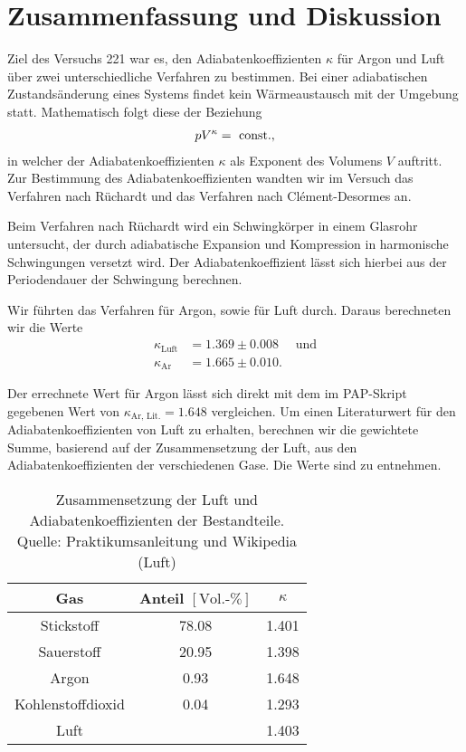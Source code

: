 \section{Zusammenfassung und Diskussion}

Ziel des Versuchs 221 war es, den Adiabatenkoeffizienten $\kappa$ für Argon und Luft über zwei unterschiedliche Verfahren zu bestimmen. Bei einer adiabatischen Zustandsänderung eines Systems findet kein Wärmeaustausch mit der Umgebung statt. Mathematisch folgt diese der Beziehung
\begin{align}
  pV^{\kappa} = \text{ const.},
\end{align}
in welcher der Adiabatenkoeffizienten $\kappa$ als Exponent des Volumens $V$ auftritt. Zur Bestimmung des Adiabatenkoeffizienten wandten wir im Versuch das Verfahren nach Rüchardt und das Verfahren nach Clément-Desormes an.

Beim Verfahren nach Rüchardt wird ein Schwingkörper in einem Glasrohr untersucht, der durch adiabatische Expansion und Kompression in harmonische Schwingungen versetzt wird. Der Adiabatenkoeffizient lässt sich hierbei aus der Periodendauer der Schwingung berechnen.

Wir führten das Verfahren für Argon, sowie für Luft durch. Daraus berechneten wir die Werte
\begin{align}
  \kappa_{\text{Luft}} &= 1.369 \pm 0.008 \quad\text{ und}\\[1em]
  \kappa_{\text{Ar}} &= 1.665 \pm 0.010.
\end{align}

Der errechnete Wert für Argon lässt sich direkt mit dem im PAP-Skript gegebenen Wert von $\kappa_{\text{Ar, Lit.}} = 1.648$ vergleichen. Um einen Literaturwert für den Adiabatenkoeffizienten von Luft zu erhalten, berechnen wir die gewichtete Summe, basierend auf der Zusammensetzung der Luft, aus den Adiabatenkoeffizienten der verschiedenen Gase. Die Werte sind  zu entnehmen.

\begin{table}[H]
  \centering
  \begin{tabular}{c|c|c}
    Gas & Anteil $[\text{Vol.-}\%]$ & $\kappa$\\\hline
    Stickstoff & 78.08 & 1.401\\
    Sauerstoff & 20.95 & 1.398\\
    Argon & 0.93 & 1.648\\
    Kohlenstoffdioxid & 0.04 & 1.293\\\hline
    Luft & & 1.403
  \end{tabular}
  \caption{Zusammensetzung der Luft und Adiabatenkoeffizienten der Bestandteile.\\Quelle: Praktikumsanleitung und Wikipedia (\glqq{}Luft\grqq{})}
  \label{tab:kappa_luft_lit}
\end{table}

